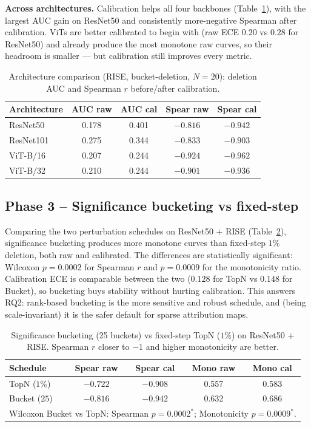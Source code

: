 \documentclass[11pt]{article}
\begin{document}
\textbf{Across architectures.} Calibration helps all four backbones
(Table~\ref{tab:arch}), with the largest AUC gain on ResNet50 and consistently
more-negative Spearman after calibration. ViTs are better calibrated to begin
with (raw ECE $0.20$ vs $0.28$ for ResNet50) and already produce the most
monotone raw curves, so their headroom is smaller --- but calibration still
improves every metric.

\begin{table}[H]
\centering\small
\caption{Architecture comparison (RISE, bucket-deletion, $N{=}20$): deletion AUC
and Spearman $r$ before/after calibration.}
\label{tab:arch}
\begin{tabular}{lcccc}
\toprule
Architecture & AUC raw & AUC cal & Spear raw & Spear cal \\
\midrule
ResNet50  & 0.178 & 0.401 & $-0.816$ & $-0.942$ \\
ResNet101 & 0.275 & 0.344 & $-0.833$ & $-0.903$ \\
ViT-B/16  & 0.207 & 0.244 & $-0.924$ & $-0.962$ \\
ViT-B/32  & 0.210 & 0.244 & $-0.901$ & $-0.936$ \\
\bottomrule
\end{tabular}
\end{table}


\subsection{Phase 3 -- Significance bucketing vs fixed-step}
Comparing the two perturbation schedules on ResNet50 + RISE
(Table~\ref{tab:bucket}), significance bucketing produces more monotone curves
than fixed-step $1\%$ deletion, both raw and calibrated. The differences are
statistically significant: Wilcoxon $p{=}0.0002$ for Spearman $r$ and
$p{=}0.0009$ for the monotonicity ratio. Calibration ECE is comparable between
the two ($0.128$ for TopN vs $0.148$ for Bucket), so bucketing buys stability
without hurting calibration. This answers RQ2: rank-based bucketing is the more
sensitive and robust schedule, and (being scale-invariant) it is the safer
default for sparse attribution maps.

\begin{table}[H]
\centering\small
\caption{Significance bucketing (25 buckets) vs fixed-step TopN ($1\%$) on
ResNet50 + RISE. Spearman $r$ closer to $-1$ and higher monotonicity are better.}
\label{tab:bucket}
\begin{tabular}{lcccc}
\toprule
Schedule & Spear raw & Spear cal & Mono raw & Mono cal \\
\midrule
TopN ($1\%$)     & $-0.722$ & $-0.908$ & 0.557 & 0.583 \\
Bucket ($25$)    & $-0.816$ & $-0.942$ & 0.632 & 0.686 \\
\midrule
\multicolumn{5}{l}{\footnotesize Wilcoxon Bucket vs TopN: Spearman $p{=}0.0002^{*}$; Monotonicity $p{=}0.0009^{*}$.}\\
\bottomrule
\end{tabular}
\end{table}
\end{document}

